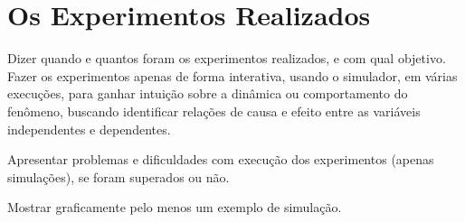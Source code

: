 % 



\section{Os Experimentos Realizados}

Dizer quando e quantos foram os experimentos realizados, e com qual  objetivo. Fazer os experimentos apenas de forma interativa, usando o simulador, em várias execuções, para ganhar intuição sobre a dinâmica ou comportamento do fenômeno, buscando identificar relações de causa e efeito entre as variáveis independentes e dependentes.

Apresentar problemas e dificuldades com execução dos experimentos (apenas simulações), se foram superados ou não.

Mostrar graficamente pelo menos um exemplo de simulação.






